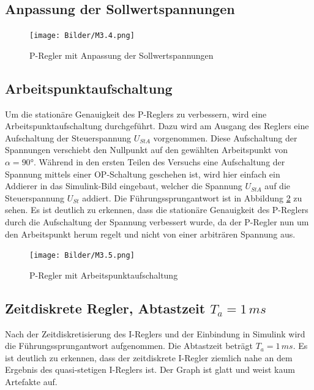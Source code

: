 \documentclass{report}
\begin{document}
\subsection{Anpassung der Sollwertspannungen}

        \begin{figure}[H]
            \centering
            \texttt{[image: Bilder/M3.4.png]}
            \caption{P-Regler mit Anpassung der Sollwertspannungen}
            \label{fig:M3.4.png}
        \end{figure}


\subsection{Arbeitspunktaufschaltung}

Um die stationäre Genauigkeit des P-Reglers zu verbessern, wird eine Arbeitspunktaufschaltung durchgeführt. Dazu wird am Ausgang des Reglers eine Aufschaltung der Steuerspannung $U_{StA}$ vorgenommen. Diese Aufschaltung der Spannungen verschiebt den Nullpunkt auf den gewählten Arbeitspunkt von $\alpha = 90°$. Während in den ersten Teilen des Versuchs eine Aufschaltung der Spannung mittels einer OP-Schaltung geschehen ist, wird hier einfach ein Addierer in das Simulink-Bild eingebaut, welcher die Spannung $U_{StA}$ auf die Steuerspannung $U_{St}$ addiert. Die Führungssprungantwort ist in Abbildung \ref{fig:M3.5.png} zu sehen. Es ist deutlich zu erkennen, dass die stationäre Genauigkeit des P-Reglers durch die Aufschaltung der Spannung verbessert wurde, da der P-Regler nun um den Arbeitspunkt herum regelt und nicht von einer arbiträren Spannung aus.

        \begin{figure}[!ht]
            \centering
            \texttt{[image: Bilder/M3.5.png]}
            \caption{P-Regler mit Arbeitspunktaufschaltung}
            \label{fig:M3.5.png}
        \end{figure}

\subsection{Zeitdiskrete Regler, Abtastzeit $T_a=1\,ms$}
Nach der Zeitdiskretisierung des I-Reglers und der Einbindung in Simulink wird die Führungssprungantwort aufgenommen. Die Abtastzeit beträgt $T_a=1\,ms$. Es ist deutlich zu  erkennen, dass der zeitdiskrete I-Regler ziemlich nahe an dem Ergebnis des quasi-stetigen I-Reglers ist. Der Graph ist glatt und weist kaum Artefakte auf.
\end{document}
